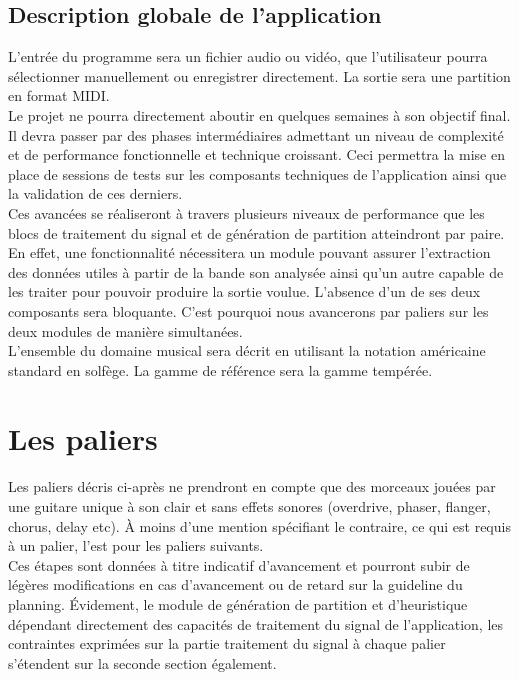 \documentclass[12pt]{article}
\begin{document}
\subsection{Description globale de l’application}

L’entrée du programme sera un fichier audio ou vidéo, que l’utilisateur pourra sélectionner manuellement ou enregistrer directement. La sortie sera une partition en format MIDI.\\

Le projet ne pourra directement aboutir en quelques semaines à son objectif final. Il devra passer par des phases intermédiaires admettant un niveau de complexité et de performance fonctionnelle et technique croissant. Ceci permettra la mise en place de sessions de tests sur les composants techniques de l’application ainsi que la validation de ces derniers.\\

Ces avancées se réaliseront à travers plusieurs niveaux de performance que les blocs de traitement du signal et de génération de partition atteindront par paire. En effet, une fonctionnalité nécessitera un module pouvant assurer l’extraction des données utiles à partir de la bande son analysée ainsi qu’un autre capable de les traiter pour pouvoir produire la sortie voulue. L’absence d’un de ses deux composants sera bloquante. C’est pourquoi nous avancerons par paliers sur les deux modules de manière simultanées. \\

L’ensemble du domaine musical sera décrit en utilisant la notation américaine standard en solfège. La gamme de référence sera la gamme tempérée. \\

\newpage
\section{Les paliers}

Les paliers décris ci-après ne prendront en compte que des morceaux jouées par une guitare unique à son clair et sans effets sonores (overdrive, phaser, flanger, chorus, delay etc). À moins d’une mention spécifiant le contraire, ce qui est requis à un palier, l’est pour les paliers suivants.\\

Ces étapes sont données à titre indicatif d’avancement et pourront subir de légères modifications en cas d’avancement ou de retard sur la guideline du planning. Évidement, le module de génération de partition et d’heuristique dépendant directement des capacités de traitement du signal de l’application, les contraintes exprimées sur la partie traitement du signal à chaque palier s’étendent sur la seconde section également.\\
\end{document}
